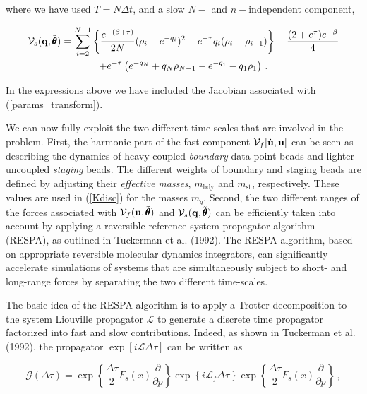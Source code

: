 \documentclass[11pt, a4paper]{article}
\newcommand{\vc}[1]{{\bf #1 }}
\newcommand{\bt}{\pmb\theta}
\begin{document}
where we have used $T = N \Delta t$, and a slow $N-$ and $n-$independent component,

\begin{multline}
{\mathcal V}_s(\vc q,\tilde{\bt})
=
    \sum_{i=2}^{N-1}
        \left\{
            \frac{e^{-(\beta+\tau)}}{2N}
            (\rho_i-e^{-q_i})^2 - e^{-\tau}
            q_i (\rho_i-\rho_{i-1})
        \right\}-\frac{(2+e^\tau)e^{-\beta}}{4}
        \\
    + e^{-\tau} \left( e^{-q_N} + q_N\rho_{N-1}
    - e^{-q_1} - q_1\rho_1\right)
\,.
\end{multline}

In the expressions above we have included the Jacobian associated with (\ref{params_transform}).

\vspace{\baselineskip}

We can now fully exploit the two different time-scales that are involved in the problem. First, the harmonic part of the fast component ${\mathcal V}_f[\dot{\vc u},\vc u]$ can be seen as describing the dynamics of heavy coupled \emph{boundary} data-point beads and lighter uncoupled \emph{staging} beads. The different weights of boundary and staging beads are defined by adjusting their \emph{effective masses}, $m_{\text{bdy}}$ and $m_{\text{st}}$, respectively. These values are used in (\ref{Kdisc}) for the masses $m_{q}$.
Second, the two different ranges of the forces associated with ${\mathcal V}_f(\vc u,\tilde{\bt})$ and ${\mathcal V}_s(\vc q,\tilde{\bt})$ can be efficiently taken into account by applying a reversible reference system propagator algorithm (RESPA), as outlined in Tuckerman et al. (1992). The RESPA algorithm, based on appropriate reversible molecular dynamics integrators, can significantly accelerate simulations of systems that are simultaneously subject to short- and long-range forces by separating the two different time-scales.

The basic idea of the RESPA algorithm is to apply a Trotter decomposition to the system Liouville propagator $\mathcal{L}$ to generate a discrete time propagator factorized into fast and slow contributions. Indeed, as shown in Tuckerman et al. (1992), the propagator $\exp[i \mathcal{L} \Delta \tau ]$ can be written as

\begin{equation}\label{G}
  \mathcal{G}(\Delta \tau)=\exp\left\{ \frac{\Delta \tau}{2} F_s(x) \frac{\partial}{\partial p} \right\} \exp\left\{ i \mathcal{L}_f \Delta \tau  \right\} \exp\left\{ \frac{\Delta \tau}{2} F_s(x) \frac{\partial}{\partial p} \right\}\,,
\end{equation}
\end{document}
